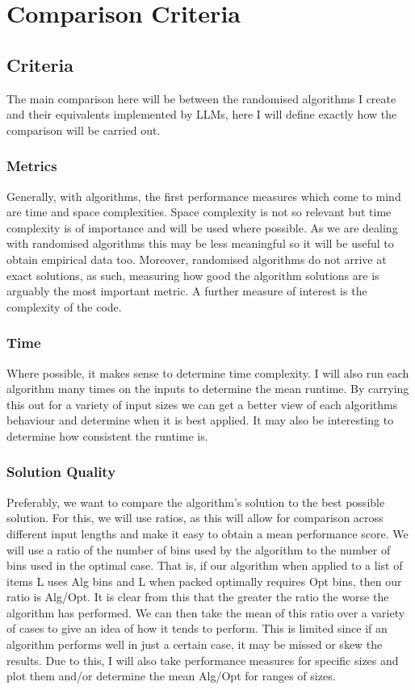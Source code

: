 \documentclass[12pt]{article}
\begin{document}
\section{Comparison Criteria}

\subsection{Criteria}
The main comparison here will be between the randomised algorithms I create and their equivalents implemented by LLMs, here I will define exactly how the comparison will be carried out.

\subsubsection{Metrics}
Generally, with algorithms, the first performance measures which come to mind are time and space complexities. Space complexity is not so relevant but time complexity is of importance and will be used where possible. As we are dealing with randomised algorithms this may be less meaningful so it will be useful to obtain empirical data too. Moreover, randomised algorithms do not arrive at exact solutions, as such, measuring how good the algorithm solutions are is arguably the most important metric. A further measure of interest is the complexity of the code. 

\subsubsection{Time}
Where possible, it makes sense to determine time complexity. I will also run each algorithm many times on the inputs to determine the mean runtime. By carrying this out for a variety of input sizes we can get a better view of each algorithms behaviour and determine when it is best applied. It may also be interesting to determine how consistent the runtime is. 

\subsubsection{Solution Quality}
Preferably, we want to compare the algorithm's solution to the best possible solution. For this, we will use ratios, as this will allow for comparison across different input lengths and make it easy to obtain a mean performance score. We will use a ratio of the number of bins used by the algorithm to the number of bins used in the optimal case. That is, if our algorithm when applied to a list of items L uses Alg bins and L when packed optimally requires Opt bins, then our ratio is Alg/Opt. It is clear from this that the greater the ratio the worse the algorithm has performed. We can then take the mean of this ratio over a variety of cases to give an idea of how it tends to perform. This is limited since if an algorithm performs well in just a certain case, it may be missed or skew the results. Due to this, I will also take performance measures for specific sizes and plot them and/or determine the mean Alg/Opt for ranges of sizes.
\end{document}
